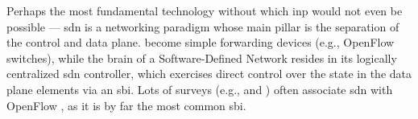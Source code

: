 Perhaps the most fundamental technology without which \gls{inp} would not even be possible --- \gls{sdn} is a networking paradigm whose main pillar is the separation of the control and data plane.
 become simple forwarding devices (e.g., OpenFlow \cite{openflow} switches), while the brain of a Software-Defined Network resides in its logically centralized \gls{sdn} controller, which exercises direct control over the state in the data plane elements via an \gls{sbi}.
Lots of surveys (e.g., \cite{kreutz2014software} and \cite{kim2013improving}) often associate \gls{sdn} with OpenFlow \cite{openflow}, as it is by far the most common \gls{sbi}.